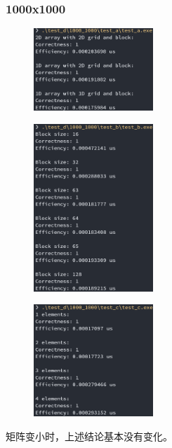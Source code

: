 \documentclass[UTF8, a4paper, 11pt]{article}
\begin{document}
\subsubsection{1000x1000}
\begin{figure}[H]
    \centering
    \includegraphics[width=0.4\textwidth]{1000_a.png}
\end{figure}
\begin{figure}[H]
    \centering
    \includegraphics[width=0.4\textwidth]{1000_b.png}
\end{figure}
\begin{figure}[H]
    \centering
    \includegraphics[width=0.4\textwidth]{1000_c.png}
\end{figure}
矩阵变小时，上述结论基本没有变化。
\end{document}
